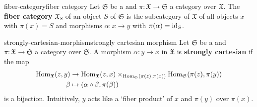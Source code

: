 \begin{topic}{fiber-category}{fiber category}
    Let $\mathfrak{S}$ be a  and $\pi \colon \mathfrak{X} \to \mathfrak{S}$ a category over $\mathfrak{X}$. The \textbf{fiber category} $\mathfrak{X}_S$ of an object $S$ of $\mathfrak{S}$ is the subcategory of $\mathfrak{X}$ of all objects $x$ with $\pi(x) = S$ and morphisms $\alpha \colon x \to y$ with $\pi(\alpha) = \textup{id}_S$.
\end{topic}

\begin{topic}{strongly-cartesian-morphism}{strongly cartesian morphism}
    Let $\mathfrak{S}$ be a  and $\pi \colon \mathfrak{X} \to \mathfrak{S}$ a category over $\mathfrak{S}$. A morphism $\alpha \colon y \to x$ in $\mathfrak{X}$ is \textbf{strongly cartesian} if the map
    \[ \begin{aligned}
        \operatorname{Hom}_\mathfrak{X}(z, y) &\to \operatorname{Hom}_\mathfrak{X}(z, x) \times_{\operatorname{Hom}_\mathfrak{S}(\pi(z), \pi(x))} \operatorname{Hom}_\mathfrak{S}(\pi(z), \pi(y)) \\
        \beta &\mapsto (\alpha \circ \beta, \pi(\beta))
    \end{aligned} \]
    is a bijection. Intuitively, $y$ acts like a `fiber product' of $x$ and $\pi(y)$ over $\pi(x)$.
\end{topic}

